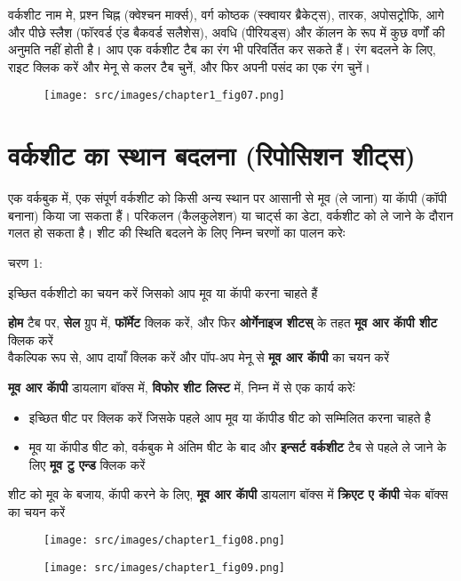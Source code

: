 वर्कशीट नाम मे, प्रश्न चिह्न (क्वेश्चन मार्क्स), वर्ग कोष्ठक (स्क्वायर ब्रैकेट्स), तारक, अपोसट्रोफि, आगे और पीछे स्लैश (फॉरवर्ड एंड बैकवर्ड सलैशेस), अवधि (पीरियड्स) और कॅालन के रूप में कुछ वर्णों की अनुमति नहीं होती है। आप एक वर्कशीट टैब का रंग भी परिवर्तित कर सकते हैं। रंग बदलने के लिए, राइट क्लिक करें और मेनू से कलर टैब चुनें, और फिर अपनी पसंद का एक रंग चुनें।
\begin{figure}[H]
\centering
\texttt{[image: src/images/chapter1\_fig07.png]}
\end{figure}

\section{वर्कशीट का स्थान बदलना (रिपोसिशन शीट्स)}\label{id-1.7}

एक वर्कबुक में, एक संपूर्ण वर्कशीट को किसी अन्य स्थान पर आसानी से मूव (ले जाना) या कॅापी (कॉपी बनाना) किया जा सकता हैं। परिकलन (कैलकुलेशन) या चार्ट्स का डेटा, वर्कशीट को ले जाने के दौरान गलत हो सकता है। शीट की स्थिति बदलने के लिए निम्न चरणों का पालन करेः
\begin{descriptionSimple}{चरण 1:}
\item[चरण 1] इच्छित वर्कशीटो का चयन करें जिसको आप मूव या कॅापी करना चाहते हैं
\item[चरण 2] \textbf{होम} टैब पर, \textbf{सेल} ग्रुप में, \textbf{फॉर्मेट} क्लिक करें, और फिर \textbf{ओर्गेनाइज शीटस्} के तहत \textbf{मूव आर कॅापी शीट} क्लिक करें\\  वैकल्पिक रूप से, आप दायाँ क्लिक करें और पॉप-अप मेनू से \textbf{मूव आर कॅापी} का चयन करें
\item[चरण 3] \textbf{मूव आर कॅापी} डायलाग बॉक्स में, \textbf{विफोर शीट लिस्ट} में, निम्न में से एक कार्य करेःं
	\begin{itemize}
		\item इच्छित षीट पर क्लिक करें जिसके पहले आप मूव या कॅापीड षीट को सम्मिलित करना चाहते है
		\item मूव या कॅापीड षीट को, वर्कबुक मे अंतिम षीट के बाद और \textbf{इन्सर्ट वर्कशीट} टैब से पहले ले जाने के लिए \textbf{मूव टु एन्ड} क्लिक करें
	\end{itemize}
\item[चरण 4] शीट को मूव के बजाय, कॅापी करने के लिए, \textbf{मूव आर कॅापी} डायलाग बॉक्स में \textbf{क्रिएट ए कॅापी} चेक बॉक्स का चयन करें
\end{descriptionSimple}

\begin{figure}[H]
\centering
\texttt{[image: src/images/chapter1\_fig08.png]}
\end{figure}
\begin{figure}[H]
\centering
\texttt{[image: src/images/chapter1\_fig09.png]}
\end{figure}

